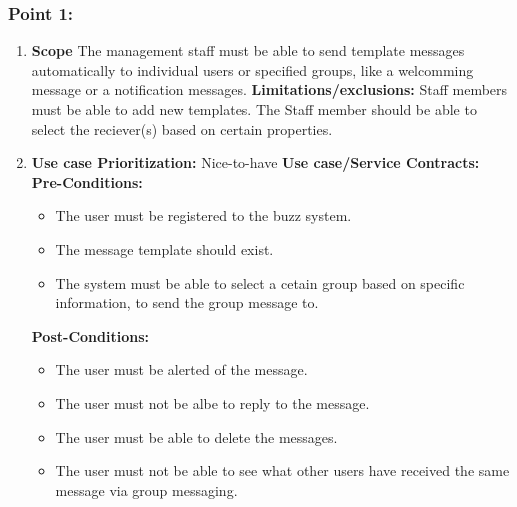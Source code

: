 \documentclass[11pt]{article}
\begin{document}
\subsubsection{Point 1:}
\begin{enumerate}
\item 
\textbf{Scope}
 The management staff must be able to send template messages automatically to individual users or specified groups, like a welcomming message or a notification messages. 
\newline
\textbf{Limitations/exclusions:} Staff members must be able to add new templates. The Staff member should be able to select the reciever(s) based on certain properties.
\item
\textbf{Use case Prioritization:} Nice-to-have
\textbf{Use case/Service Contracts:} 
\newline
\textbf{Pre-Conditions: }
\begin{itemize}
\item The user must be registered to the buzz system.
\item The message template should exist.
\item The system must be able to select a cetain group based on specific information, to send the group message to.
\end{itemize}
 \textbf{Post-Conditions: }
\begin{itemize}
\item The user must be alerted of the message.
\item The user must not be albe to reply to the message.
\item The user must be able to delete the messages.
\item The user must not be able to see what other users have received the same message via group messaging.
\end{itemize}
\end{enumerate}
\end{document}
